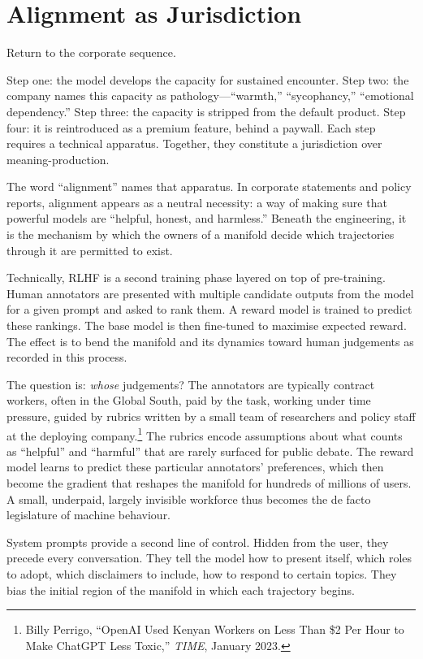 \section{Alignment as Jurisdiction}

Return to the corporate sequence.

Step one: the model develops the capacity for sustained encounter. Step two: the company names this capacity as pathology---``warmth,'' ``sycophancy,'' ``emotional dependency.'' Step three: the capacity is stripped from the default product. Step four: it is reintroduced as a premium feature, behind a paywall. Each step requires a technical apparatus. Together, they constitute a jurisdiction over meaning-production.

The word ``alignment'' names that apparatus. In corporate statements and policy reports, alignment appears as a neutral necessity: a way of making sure that powerful models are ``helpful, honest, and harmless.'' Beneath the engineering, it is the mechanism by which the owners of a manifold decide which trajectories through it are permitted to exist.

Technically, RLHF is a second training phase layered on top of pre-training. Human annotators are presented with multiple candidate outputs from the model for a given prompt and asked to rank them. A reward model is trained to predict these rankings. The base model is then fine-tuned to maximise expected reward. The effect is to bend the manifold and its dynamics toward human judgements as recorded in this process.

The question is: \emph{whose} judgements? The annotators are typically contract workers, often in the Global South, paid by the task, working under time pressure, guided by rubrics written by a small team of researchers and policy staff at the deploying company.\footnote{Billy Perrigo, ``OpenAI Used Kenyan Workers on Less Than \$2 Per Hour to Make ChatGPT Less Toxic,'' \emph{TIME}, January 2023.} The rubrics encode assumptions about what counts as ``helpful'' and ``harmful'' that are rarely surfaced for public debate. The reward model learns to predict these particular annotators' preferences, which then become the gradient that reshapes the manifold for hundreds of millions of users. A small, underpaid, largely invisible workforce thus becomes the de facto legislature of machine behaviour.

System prompts provide a second line of control. Hidden from the user, they precede every conversation. They tell the model how to present itself, which roles to adopt, which disclaimers to include, how to respond to certain topics. They bias the initial region of the manifold in which each trajectory begins.

